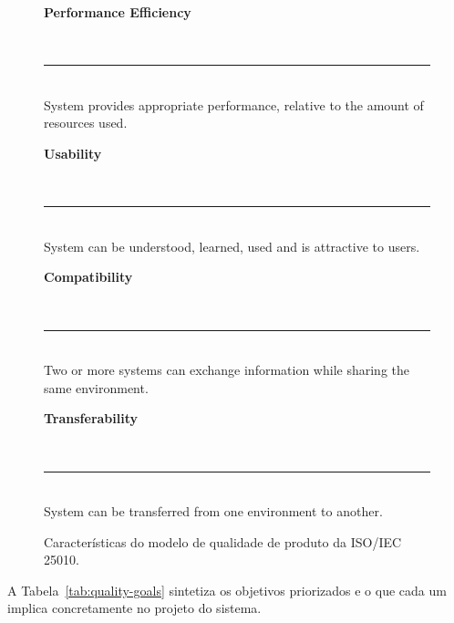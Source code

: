 \documentclass[a4paper,12pt,oneside,openany]{book}
\begin{document}
\begin{figure}[H]
{\begin{minipage}{0.94\textwidth}
\begin{minipage}[t]{0.235\linewidth}
\parbox[t][2\baselineskip][t]{\linewidth}{\bfseries\color{isogreen}Performance Efficiency}\\[2pt]
{\color{isogreen}\rule{\linewidth}{0.8pt}}\\[4pt]
\footnotesize System provides appropriate performance, relative to the
amount of resources used.
\end{minipage}\hfill
\begin{minipage}[t]{0.235\linewidth}
\parbox[t][2\baselineskip][t]{\linewidth}{\bfseries\color{isogreen}Usability}\\[2pt]
{\color{isogreen}\rule{\linewidth}{0.8pt}}\\[4pt]
\footnotesize System can be understood, learned, used and is attractive to
users.
\end{minipage}\hfill
\begin{minipage}[t]{0.235\linewidth}
\parbox[t][2\baselineskip][t]{\linewidth}{\bfseries\color{isogreen}Compatibility}\\[2pt]
{\color{isogreen}\rule{\linewidth}{0.8pt}}\\[4pt]
\footnotesize Two or more systems can exchange information while sharing the
same environment.
\end{minipage}\hfill
\begin{minipage}[t]{0.235\linewidth}
\parbox[t][2\baselineskip][t]{\linewidth}{\bfseries\color{isogreen}Transferability}\\[2pt]
{\color{isogreen}\rule{\linewidth}{0.8pt}}\\[4pt]
\footnotesize System can be transferred from one environment to another.
\end{minipage}
\end{minipage}}
\caption{Características do modelo de qualidade de produto da ISO/IEC 25010.}
\label{fig:iso25010}
\end{figure}

A Tabela~\ref{tab:quality-goals} sintetiza os objetivos priorizados e o que cada
um implica concretamente no projeto do sistema.
\end{document}
